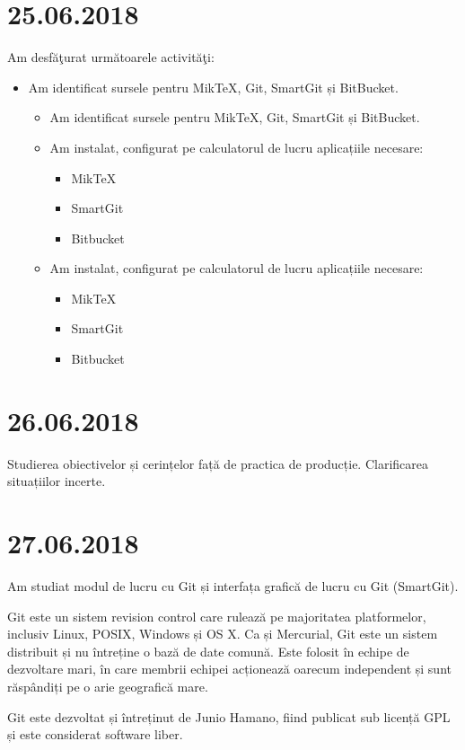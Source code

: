 \documentclass{report}
\begin{document}
\chapter{25.06.2018}
Am desfăţurat următoarele activităţi:
\begin{itemize}
\item
Am identificat sursele pentru MikTeX, Git, SmartGit și BitBucket.
\begin{itemize}
\item
Am identificat sursele pentru MikTeX, Git, SmartGit și BitBucket.
\item
Am instalat, configurat pe calculatorul de lucru aplicațiile necesare:
\begin{itemize}
\item
MikTeX
\item
SmartGit
\item
Bitbucket
\end{itemize}
\item
Am instalat, configurat pe calculatorul de lucru aplicațiile necesare:
\begin{itemize}
\item
MikTeX
\item
SmartGit
\item
Bitbucket
\end{itemize}

\end{itemize}
\end{itemize}

\chapter{26.06.2018}
Studierea obiectivelor și cerințelor față de practica de producție. Clarificarea situațiilor incerte.
\chapter{27.06.2018}
Am studiat modul de lucru cu Git și interfața grafică de lucru cu Git (SmartGit).

\item Git este un sistem revision control care rulează pe majoritatea platformelor, inclusiv Linux, POSIX, Windows și OS X. Ca și Mercurial, Git este un sistem distribuit și nu întreține o bază de date comună. Este folosit în echipe de dezvoltare mari, în care membrii echipei acționează oarecum independent și sunt răspândiți pe o arie geografică mare.

Git este dezvoltat și întreținut de Junio Hamano, fiind publicat sub licență GPL și este considerat software liber.
\end{document}
